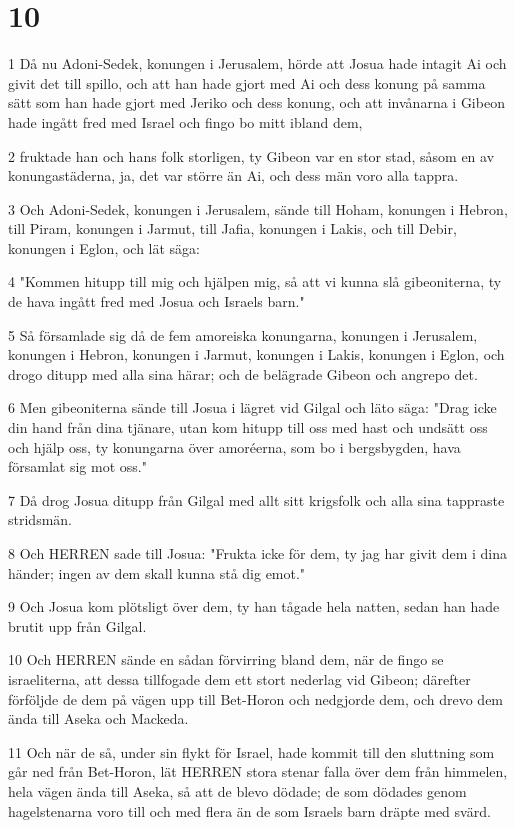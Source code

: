 \chapter{10}

\par 1 Då nu Adoni-Sedek, konungen i Jerusalem, hörde att Josua hade intagit Ai och givit det till spillo, och att han hade gjort med Ai och dess konung på samma sätt som han hade gjort med Jeriko och dess konung, och att invånarna i Gibeon hade ingått fred med Israel och fingo bo mitt ibland dem,
\par 2 fruktade han och hans folk storligen, ty Gibeon var en stor stad, såsom en av konungastäderna, ja, det var större än Ai, och dess män voro alla tappra.
\par 3 Och Adoni-Sedek, konungen i Jerusalem, sände till Hoham, konungen i Hebron, till Piram, konungen i Jarmut, till Jafia, konungen i Lakis, och till Debir, konungen i Eglon, och lät säga:
\par 4 "Kommen hitupp till mig och hjälpen mig, så att vi kunna slå gibeoniterna, ty de hava ingått fred med Josua och Israels barn."
\par 5 Så församlade sig då de fem amoreiska konungarna, konungen i Jerusalem, konungen i Hebron, konungen i Jarmut, konungen i Lakis, konungen i Eglon, och drogo ditupp med alla sina härar; och de belägrade Gibeon och angrepo det.
\par 6 Men gibeoniterna sände till Josua i lägret vid Gilgal och läto säga: "Drag icke din hand från dina tjänare, utan kom hitupp till oss med hast och undsätt oss och hjälp oss, ty konungarna över amoréerna, som bo i bergsbygden, hava församlat sig mot oss."
\par 7 Då drog Josua ditupp från Gilgal med allt sitt krigsfolk och alla sina tappraste stridsmän.
\par 8 Och HERREN sade till Josua: "Frukta icke för dem, ty jag har givit dem i dina händer; ingen av dem skall kunna stå dig emot."
\par 9 Och Josua kom plötsligt över dem, ty han tågade hela natten, sedan han hade brutit upp från Gilgal.
\par 10 Och HERREN sände en sådan förvirring bland dem, när de fingo se israeliterna, att dessa tillfogade dem ett stort nederlag vid Gibeon; därefter förföljde de dem på vägen upp till Bet-Horon och nedgjorde dem, och drevo dem ända till Aseka och Mackeda.
\par 11 Och när de så, under sin flykt för Israel, hade kommit till den sluttning som går ned från Bet-Horon, lät HERREN stora stenar falla över dem från himmelen, hela vägen ända till Aseka, så att de blevo dödade; de som dödades genom hagelstenarna voro till och med flera än de som Israels barn dräpte med svärd.
